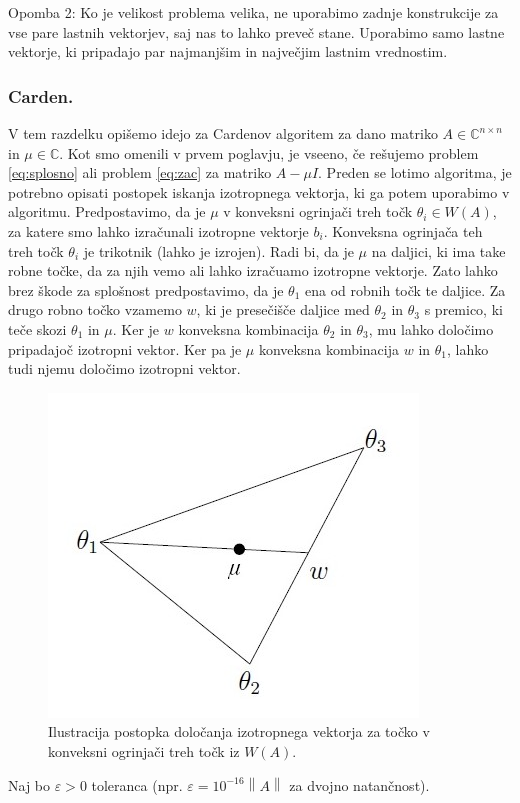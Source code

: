\documentclass[12pt,a4paper]{amsart}
\theoremstyle{definition}
\theoremstyle{plain}
\newcommand{\C}{\mathbb C}
\newcommand{\norm}[1]{\left\lVert#1\right\rVert}
\begin{document}
Opomba 2: Ko je velikost problema velika, ne uporabimo zadnje konstrukcije za vse pare lastnih vektorjev, saj nas to lahko preveč stane. Uporabimo samo lastne vektorje, ki pripadajo par najmanjšim in največjim lastnim vrednostim.\\
\subsubsection{Carden.}
V tem razdelku opišemo idejo za Cardenov algoritem za dano matriko $A \in \C^{n\times n}$ in $\mu \in \C$. Kot smo omenili v prvem poglavju, je vseeno, če rešujemo problem \ref{eq:splosno} ali problem \ref{eq:zac} za matriko $A-\mu I$. Preden se lotimo algoritma, je potrebno opisati postopek iskanja izotropnega vektorja, ki ga potem uporabimo v algoritmu. Predpostavimo, da je $\mu$ v konveksni ogrinjači treh točk $\theta_i \in W(A)$, za katere smo lahko izračunali izotropne vektorje $b_i$. Konveksna ogrinjača teh treh točk $\theta_i$ je trikotnik (lahko je izrojen). Radi bi, da je $\mu$ na daljici, ki ima take robne točke, da za njih vemo ali lahko izračuamo izotropne vektorje. Zato lahko brez škode za splošnost predpostavimo, da je $\theta_1$ ena od robnih točk te daljice. Za drugo robno točko vzamemo $w$, ki je presečišče daljice med $\theta_2$ in $\theta_3$ s premico, ki teče skozi $\theta_1$ in $\mu$. Ker je $w$ konveksna kombinacija $\theta_2$ in $\theta_3$, mu lahko določimo pripadajoč izotropni vektor. Ker pa je $\mu$ konveksna kombinacija $w$ in $\theta_1$, lahko tudi njemu določimo izotropni vektor.\\
\begin{figure} [h]
\centering
\includegraphics[scale=0.7]{triangle}
\caption{Ilustracija postopka določanja izotropnega vektorja za točko v konveksni ogrinjači treh točk iz $W(A)$.}
\label{fig:triangle}
\end{figure}
Naj bo $\varepsilon >0$ toleranca (npr. $\varepsilon=10^{-16}\norm{A}$ za dvojno natančnost). 
\end{document}
